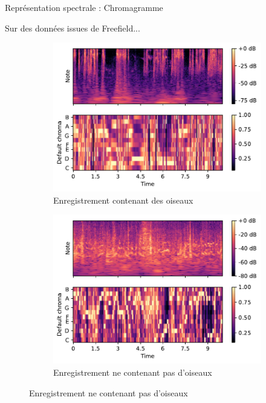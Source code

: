 \documentclass[compress,xcolor=table]{beamer}
\begin{document}
\begin{frame}{Représentation spectrale : Chromagramme}

    Sur des données issues de Freefield...

    \begin{figure}[ht]
        \centering
        \begin{subfigure}[b]{0.45\textwidth}
            \centering
            \includegraphics[width=\textwidth]{../images/audio/birds.chromagram.ff1010.pdf}
            \caption{Enregistrement contenant des oiseaux}
            \label{fig:birds.chromagram.ff1010}
        \end{subfigure}
        \hfill
        \begin{subfigure}[b]{0.45\textwidth}
            \centering
            \includegraphics[width=\textwidth]{../images/audio/nobirds.chromagram.ff1010.pdf}
            \caption{Enregistrement ne contenant pas d'oiseaux}
            \label{fig:nobirds.chromagram.ff1010}
        \end{subfigure}
    \end{figure}


\end{frame}
\end{document}

